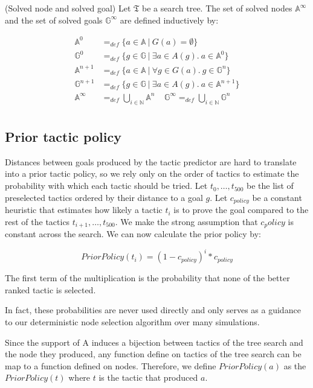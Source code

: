 \documentclass[runningheads,a4paper,draft]{svjour3}
\begin{document}
\begin{definition}(Solved node and solved goal)
Let $\mathfrak{T}$ be a search tree. The set of solved nodes 
$\mathbb{A}^\infty$ and 
the set of solved goals $\mathbb{G}^\infty$ are defined inductively by:

\begin{align*}
\mathbb{A}^{0} &=_{def} 
\lbrace a \in \mathbb{A}\ |\ G(a) = \emptyset \rbrace \\ 
\mathbb{G}^{0} &=_{def} \lbrace g \in \mathbb{G}\ |\ 
\exists a \in A(g).\ a \in \mathbb{A}^{0} \rbrace\\
\mathbb{A}^{n+1} &=_{def} \lbrace a \in \mathbb{A}\ |\ 
\forall g \in G(a).\ g \in \mathbb{G}^{n} \rbrace\\
\mathbb{G}^{n+1} &=_{def} \lbrace g \in \mathbb{G}\ |\ 
\exists a \in A(g).\ a \in \mathbb{A}^{n+1} \rbrace \\
\mathbb{A}^\infty &=_{def} \bigcup_{i \in \mathbb{N}} \mathbb{A}^n \ \ \ \ \ 
\mathbb{G}^\infty =_{def} \bigcup_{i \in \mathbb{N}} \mathbb{G}^n\\
\end{align*}
\end{definition}

\subsection{Prior tactic policy}\label{sec:policy}
Distances between goals produced by the tactic predictor are hard 
to translate into a prior tactic policy, so we rely only on the order of 
tactics to estimate the probability with which each tactic should be tried.
Let $t_0,\ldots,t_500$ be the list of preselected tactics ordered by their 
distance to a goal $g$. Let $c_{policy}$ be a constant heuristic that estimates 
how likely a tactic $t_i$ is to prove the goal compared to the rest of the 
tactics $t_{i+1},\ldots,t_{500}$. We make the strong assumption that $c_policy$ 
is constant across the search. We can now calculate the prior policy by:
   
\[PriorPolicy(t_{i}) = (1 - c_{policy})^{i} * c_{policy}\]

The first term of the multiplication is the probability that none of the better 
ranked tactic is selected. 

In fact, these probabilities are never used directly and only serves as a 
guidance to our deterministic node selection algorithm over many simulations.

Since the support of A induces a bijection between tactics of the tree 
search and the node they 
produced, any function define on tactics of the tree search can be map to a 
function defined on nodes. 
Therefore, we define $PriorPolicy(a)$ as the $PriorPolicy(t)$ where $t$ is the 
tactic that produced $a$.
\end{document}
